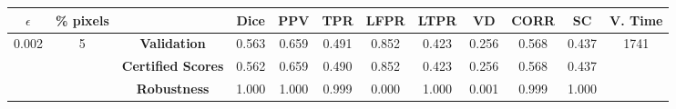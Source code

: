 \begin{longtable}{ c  c | c | c  c  c  c  c  c  c c c}
\toprule \textbf{$\epsilon$} & \textbf{\% pixels} & & \textbf{Dice} & \textbf{PPV} & \textbf{TPR} & \textbf{LFPR} & \textbf{LTPR} & \textbf{VD} & \textbf{CORR} & \textbf{SC} & \textbf{V. Time} \\
\midrule 
\multirow{3}{*}{0.002}  & \multirow{3}{*}{5} &\textbf{Validation} & 0.563 & 0.659 & 0.491 & 0.852 & 0.423 & 0.256 & 0.568 & 0.437 & \multirow{3}{*}{1741} \\
 & & \textbf{Certified Scores} & 0.562 & 0.659 & 0.490 & 0.852 & 0.423 & 0.256 & 0.568 & 0.437 & \\
& & \textbf{Robustness} & 1.000 & 1.000 & 0.999 & 0.000 & 1.000 & 0.001 & 0.999 & 1.000 & \\
\end{longtable}